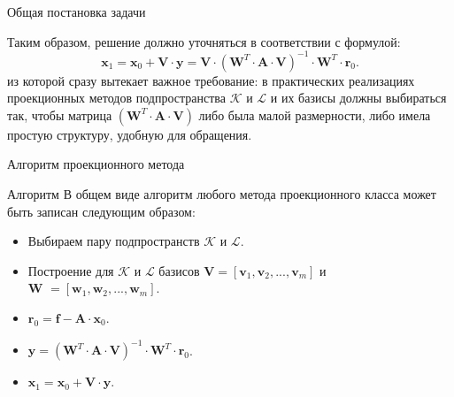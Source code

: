 \documentclass[10pt,xcolor=pst,aspectratio=169]{beamer}
\begin{document}
\begin{frame}{Общая постановка задачи}

	\transdissolve[duration=0.2]
	\justifying
	\large
	Таким образом, решение должно уточняться в соответствии с формулой:
	\[
		\textbf{x}_{1} = \textbf{x}_{0} + \textbf{V} \cdot \textbf{y} = \textbf{V} \cdot \left( \textbf{W}^{T} \cdot \textbf{A} \cdot \textbf{V} \right)^{-1} \cdot \textbf{W}^{T} \cdot \textbf{r}_{0}.
	\]
	из которой сразу вытекает важное требование: в практических реализациях проекционных методов подпространства $\mathcal{K}$ и $\mathcal{L}$ и их базисы должны выбираться так, чтобы матрица $\left( \textbf{W}^{T} \cdot \textbf{A} \cdot \textbf{V} \right)$ либо была малой размерности, либо имела простую структуру, удобную для обращения.

\end{frame}

\begin{frame}{Алгоритм проекционного метода}

	\transdissolve[duration=0.2]
	\justifying
	\large
	\begin{block}{Алгоритм}
		В общем виде алгоритм любого метода проекционного класса может быть записан следующим образом:
		\begin{itemize}
			\item Выбираем пару подпространств $\mathcal{K}$ и $\mathcal{L}$.
			\item Построение для $\mathcal{K}$ и $\mathcal{L}$ базисов $\textbf{V} = [\textbf{v}_1, \textbf{v}_2 , ..., \textbf{v}_m]$ и $\textbf{W } = [\textbf{w}_1, \textbf{w}_2, ..., \textbf{w}_m ]$.
			\item $\textbf{r}_{0} = \textbf{f} - \textbf{A} \cdot \textbf{x}_{0}$.
			\item $\textbf{y} = \left( \textbf{W}^{T} \cdot \textbf{A} \cdot \textbf{V} \right)^{-1} \cdot \textbf{W}^{T} \cdot \textbf{r}_{0}$.
			\item $\textbf{x}_{1} = \textbf{x}_{0} + \textbf{V} \cdot \textbf{y}$.
		\end{itemize}
	\end{block}

\end{frame}
\end{document}

